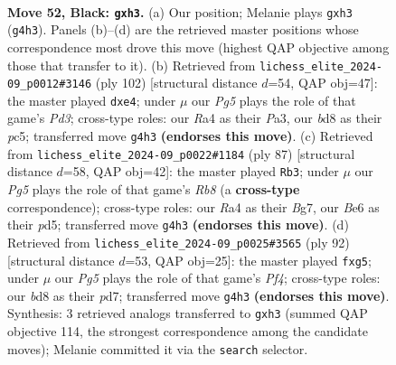 \documentclass[11pt]{article}
\begin{document}
\clearpage

\begin{figure}[p]\centering
\begin{subfigure}{0.46\textwidth}\centering
\resizebox{\linewidth}{!}{%
\newchessgame
\chessboard[
  setfen={1R1B4/5k2/2r1b3/1p6/rn4p1/4P1PP/1R3P1K/8 b - - 5 52},
  showmover=false,
  pgfstyle=straightmove, color=movearrow, markmove={g4-h3}
]}
\caption{}
\end{subfigure}\hfill
\begin{subfigure}{0.46\textwidth}\centering
\resizebox{\linewidth}{!}{%
\newchessgame
\chessboard[
  setfen={7R/3b3P/3k2p1/2p4r/p1B1p3/P2P2K1/8/8 w - - 0 52},
  showmover=false,
  pgfstyle=straightmove, color=movearrow, markmove={d3-e4}
]}
\caption{}
\end{subfigure}
\\[4pt]
\begin{subfigure}{0.46\textwidth}\centering
\resizebox{\linewidth}{!}{%
\newchessgame
\chessboard[
  setfen={8/5rbk/3p3p/3P4/R4P2/2P3P1/p6P/1r3RK1 b - - 4 44},
  showmover=false,
  pgfstyle=straightmove, color=movearrow, markmove={b1-b3}
]}
\caption{}
\end{subfigure}\hfill
\begin{subfigure}{0.46\textwidth}\centering
\resizebox{\linewidth}{!}{%
\newchessgame
\chessboard[
  setfen={8/1r1p1k2/4p3/2rp2p1/1P3P2/1R3K2/4B3/8 w - - 0 47},
  showmover=false,
  pgfstyle=straightmove, color=movearrow, markmove={f4-g5}
]}
\caption{}
\end{subfigure}
\caption{\textbf{Move 52, Black: \texttt{gxh3}.} (a) Our position; Melanie plays \texttt{gxh3} (\texttt{g4h3}). Panels (b)--(d) are the retrieved master positions whose correspondence most drove this move (highest QAP objective among those that transfer to it). (b) Retrieved from \texttt{lichess\_elite\_2024-09\_p0012\#3146} (ply 102) [structural distance $d$=54, QAP obj=47]: the master played \texttt{dxe4}; under $\mu$ our \emph{Pg5} plays the role of that game's \emph{Pd3}; cross-type roles: our \emph{R}a4 as their \emph{P}a3, our \emph{b}d8 as their \emph{p}c5; transferred move \texttt{g4h3} \textbf{(endorses this move)}. (c) Retrieved from \texttt{lichess\_elite\_2024-09\_p0022\#1184} (ply 87) [structural distance $d$=58, QAP obj=42]: the master played \texttt{Rb3}; under $\mu$ our \emph{Pg5} plays the role of that game's \emph{Rb8} (a \textbf{cross-type} correspondence); cross-type roles: our \emph{R}a4 as their \emph{B}g7, our \emph{B}e6 as their \emph{p}d5; transferred move \texttt{g4h3} \textbf{(endorses this move)}. (d) Retrieved from \texttt{lichess\_elite\_2024-09\_p0025\#3565} (ply 92) [structural distance $d$=53, QAP obj=25]: the master played \texttt{fxg5}; under $\mu$ our \emph{Pg5} plays the role of that game's \emph{Pf4}; cross-type roles: our \emph{b}d8 as their \emph{p}d7; transferred move \texttt{g4h3} \textbf{(endorses this move)}. Synthesis: 3 retrieved analogs transferred to \texttt{gxh3} (summed QAP objective 114, the strongest correspondence among the candidate moves); Melanie committed it via the \texttt{search} selector.}
\label{fig:thought-m103}
\end{figure}
\end{document}
